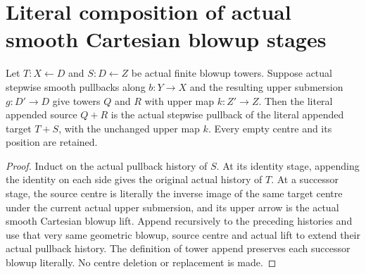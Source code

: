 \section{Literal composition of actual smooth Cartesian blowup stages}

\begin{lemma}
\label{hir:actual-smooth-cartesian-tower-append}
\leanok
Let $T:X\leftarrow D$ and $S:D\leftarrow Z$ be actual finite blowup
towers. Suppose actual stepwise smooth pullbacks along $b:Y\to X$
and the resulting upper submersion $g:D'\to D$ give towers $Q$ and
$R$ with upper map $k:Z'\to Z$. Then the literal appended source
$Q\mathbin{+}R$ is the actual stepwise pullback of the literal appended
target $T\mathbin{+}S$, with the unchanged upper map $k$. Every empty
centre and its position are retained.
\end{lemma}
\begin{proof}
Induct on the actual pullback history of $S$. At its identity stage,
appending the identity on each side gives the original actual history
of $T$. At a successor stage, the source centre is literally the
inverse image of the same target centre under the current actual upper
submersion, and its upper arrow is the actual smooth Cartesian blowup
lift. Append recursively to the preceding histories and use that very
same geometric blowup, source centre and actual lift to extend their
actual pullback history. The definition of tower append preserves each
successor blowup literally. No centre deletion or replacement is made.
\end{proof}

